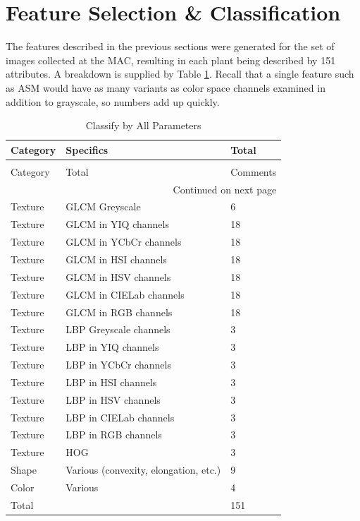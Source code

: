 \documentclass[letterpaper, notitlepage]{report}
\begin{document}
\section{Feature Selection \& Classification}
The features described in the previous sections were generated for the set of images collected at the \gls{MAC}, resulting in each plant being described by 151 attributes. A breakdown is supplied by Table \ref{table:parameters}. Recall that a single feature such as \gls{ASM} would have as many variants as color space channels examined in addition to grayscale, so numbers add up quickly. 
\begin{longtable}{lll}
\caption[Parameters Considered for Classification]{Parameters Considered for Classification}
\label{table:parameters}\\
\toprule
   Category &  Specifics & Total\\
\midrule
\endfirsthead
\caption[]{Classify by All Parameters} \\
\toprule
   Category &  Total & Comments\\
\midrule
\endhead
\midrule
\multicolumn{3}{r}{{Continued on next page}} \\
\midrule
\endfoot

\bottomrule
\endlastfoot
Texture & GLCM Greyscale & 6 \\
Texture & GLCM in YIQ channels & 18 \\
Texture & GLCM in YCbCr channels& 18 \\
Texture & GLCM in HSI channels& 18 \\
Texture & GLCM in HSV channels& 18\\
Texture & GLCM in CIELab channels& 18 \\
Texture & GLCM in RGB channels& 18 \\
Texture & LBP Greyscale channels& 3 \\
Texture & LBP in YIQ channels& 3 \\
Texture & LBP in YCbCr channels& 3 \\
Texture & LBP in HSI channels& 3 \\
Texture & LBP in HSV channels& 3 \\
Texture & LBP in CIELab channels& 3 \\
Texture & LBP in RGB channels& 3 \\
Texture & HOG & 3 \\
Shape & Various (convexity, elongation, etc.) & 9 \\
Color & Various & 4 \\
\midrule
Total& & 151\\
\bottomrule
\end{longtable}
\end{document}

